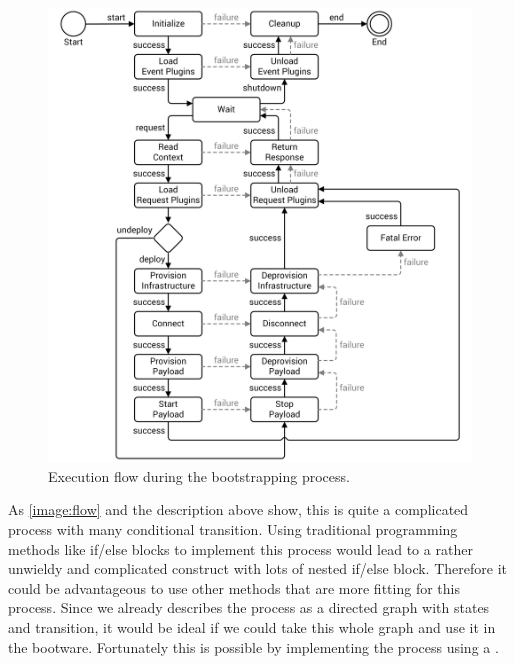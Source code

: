 \begin{figure}[!htbp]
	\centering
	\includegraphics[resolution=600]{design/assets/flow}
	\caption{Execution flow during the bootstrapping process.}
	\label{image:flow}
\end{figure}

As \autoref{image:flow} and the description above show, this is quite a complicated process with many conditional transition.
Using traditional programming methods like if/else blocks to implement this process would lead to a rather unwieldy and complicated construct with lots of nested if/else block.
Therefore it could be advantageous to use other methods that are more fitting for this process.
Since we already describes the process as a directed graph with states and transition, it would be ideal if we could take this whole graph and use it in the bootware.
Fortunately this is possible by implementing the process using a .
